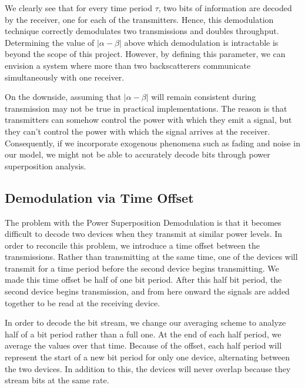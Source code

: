 \documentclass[letterpaper, 10 pt, conference]{IEEEconf}
\begin{document}
We clearly see that for every time period $\tau$, two bits of information are decoded by the receiver, one for each of the transmitters. Hence, this demodulation technique correctly demodulates two transmissions and doubles throughput. Determining the value of $|\alpha - \beta|$ above which demodulation is intractable is beyond the scope of this project. However, by defining this parameter, we can envision a system where more than two backscatterers communicate simultaneously with one receiver.

On the downside, assuming that $|\alpha - \beta|$ will remain consistent during transmission may not be true in practical implementations. The reason is that transmitters can somehow control the power with which they emit a signal, but they can't control the power with which the signal arrives at the receiver. Consequently, if we incorporate exogenous phenomena such as fading and noise in our model, we might not be able to accurately decode bits through power superposition analysis.

\subsection{Demodulation via Time Offset}
The problem with the Power Superposition Demodulation is that it becomes difficult to decode two devices when they transmit at similar power levels. In order to reconcile this problem, we introduce a time offset between the transmissions. Rather than transmitting at the same time, one of the devices will transmit for a time period before the second device begins transmitting. We made this time offset be half of one bit period. After this half bit period, the second device begins transmission, and from here onward the signals are added together to be read at the receiving device.

In order to decode the bit stream, we change our averaging scheme to analyze half of a bit period rather than a full one. At the end of each half period, we average the values over that time. Because of the offset, each half period will represent the start of a new bit period for only one device, alternating between the two devices. In addition to this, the devices will never overlap because they stream bits at the same rate.
\end{document}
